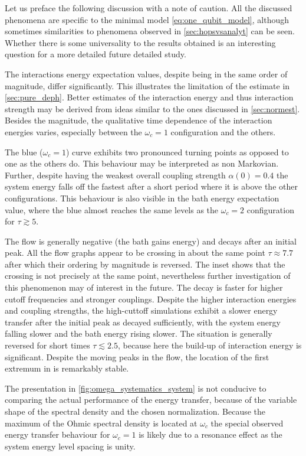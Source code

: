 Let us preface the following discussion with a note of caution. All
the discussed phenomena are specific to the minimal model
\cref{eq:one_qubit_model}, although sometimes similarities to
phenomena observed in \cref{sec:hopsvsanalyt} can be seen. Whether
there is some universality to the results obtained is an interesting
question for a more detailed future detailed study.

The interactions energy expectation values, despite being in the same
order of magnitude, differ significantly. This illustrates the
limitation of the estimate in \cref{sec:pure_deph}. Better estimates
of the interaction energy and thus interaction strength may be derived
from ideas similar to the ones discussed in
\cref{sec:normest}. Besides the magnitude, the qualitative time
dependence of the interaction energies varies, especially between the
\(ω_c=1\) configuration and the others.

The blue (\(ω_c=1\)) curve exhibits two pronounced turning points as
opposed to one as the others do. This behaviour may be interpreted as
non Markovian. Further, despite having the weakest overall coupling
strength \(α(0)=0.4\) the system energy falls off the fastest after a
short period where it is above the other configurations. This
behaviour is also visible in the bath energy expectation value, where
the blue almost reaches the same levels as the \(ω_c=2\) configuration
for \(τ\gtrsim 5\).

The flow is generally negative (the bath gains energy) and decays
after an initial peak. All the flow graphs appear to be crossing in
about the same point \(τ\approx 7.7\) after which their ordering by
magnitude is reversed.  The inset shows that the crossing is not
precisely at the same point, nevertheless further investigation of
this phenomenon may of interest in the future. The decay is
faster for higher cutoff frequencies and stronger couplings. Despite
the higher interaction energies and coupling strengths, the
high-cuttoff simulations exhibit a slower energy transfer after the
initial peak as decayed sufficiently, with the system energy falling
slower and the bath energy rising slower. The situation is generally
reversed for short times \(τ\lesssim 2.5\), because here the build-up
of interaction energy is significant. Despite the moving peaks in the
flow, the location of the first extremum in is remarkably stable.

The presentation in \cref{fig:omega_systematics_system} is not
conducive to comparing the actual performance of the energy transfer,
because of the variable shape of the spectral density and the chosen
normalization. Because the maximum of the Ohmic spectral density is
located at \(ω_c\) the special observed energy transfer behaviour for
\(ω_c=1\) is likely due to a resonance effect as the system energy
level spacing is unity.

